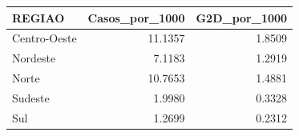 \begin{tabular}{lrr}
\toprule
REGIAO & Casos\_por\_1000 & G2D\_por\_1000 \\
\midrule
Centro-Oeste & 11.1357 & 1.8509 \\
Nordeste & 7.1183 & 1.2919 \\
Norte & 10.7653 & 1.4881 \\
Sudeste & 1.9980 & 0.3328 \\
Sul & 1.2699 & 0.2312 \\
\bottomrule
\end{tabular}
